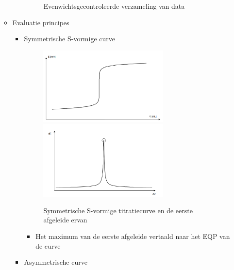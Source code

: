\documentclass[10pt]{report}
\begin{document}
\begin{itemize}
\begin{itemize}
\begin{itemize}
\begin{figure}[h]
                            \caption{Evenwichtsgecontroleerde verzameling van data}
                        \end{figure}
                \end{itemize}
            \newpage
            \item Evaluatie principes
                \begin{itemize}
                    \item Symmetrische S-vormige curve
                        \begin{figure}[h]
                            \centering
                            \includegraphics[width=0.7\textwidth]{rfpcir6.png}
                            \includegraphics[width=0.7\textwidth]{rfpcir7.png}
                            \caption{Symmetrische S-vormige titratiecurve en de eerste afgeleide ervan}
                        \end{figure}
                        \begin{itemize}
                            \item Het maximum van de eerste afgeleide vertaald naar het EQP van de curve
                        \end{itemize}
                    \newpage
                    \item Asymmetrische curve
                        \begin{figure}[h]
                            \centering

\end{figure}
\end{itemize}
\end{itemize}
\end{itemize}
\end{document}

